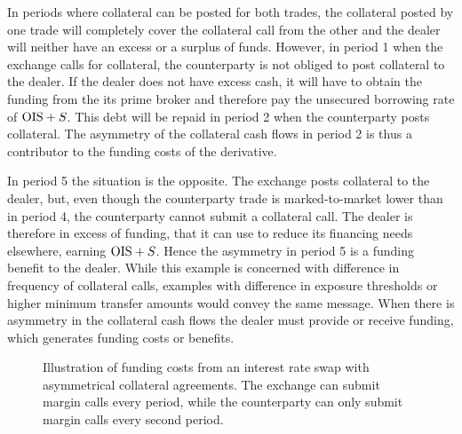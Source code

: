 \documentclass[main.tex]{subfiles}
\begin{document}
        In periods where collateral can be posted for both trades, 
        the collateral posted by one trade will completely cover the collateral call from the other
        and the dealer will neither have an excess or a surplus of funds.
        However, in period 1 when the exchange calls for collateral,
        the counterparty is not obliged to post collateral to the dealer. 
        If the dealer does not have excess cash, 
        it will have to obtain the funding from the its prime broker 
        and therefore pay the unsecured borrowing rate of $\OIS/ + S$. 
        This debt will be repaid in period 2 when the counterparty posts collateral.
        The asymmetry of the collateral cash flows in period 2
        is thus a contributor to the funding costs of the derivative.

        In period 5 the situation is the opposite.
        The exchange posts collateral to the dealer, 
        but, even though the counterparty trade is marked-to-market lower than in period 4,
        the counterparty cannot submit a collateral call. 
        The dealer is therefore in excess of funding,
        that it can use to reduce its financing needs elsewhere, earning $\OIS/ + S$.
        Hence the asymmetry in period 5 is a funding benefit to the dealer.
        While this example is concerned with difference in frequency of collateral calls,
        examples with difference in exposure thresholds or higher minimum transfer amounts 
        would convey the same message.
        When there is asymmetry in the collateral cash flows the dealer must provide or receive funding,
        which generates funding costs or benefits.

        \begin{figure}
            \centering
            \resizebox{\textwidth}{!}{%
            \begin{tikzpicture}
                
            \end{tikzpicture}        
            }   
            \caption{
                Illustration of funding costs from an interest rate swap with asymmetrical collateral agreements.
                The exchange can submit margin calls every period,
                while the counterparty can only submit margin calls every second period.
            }
            \label{fig:funding-costs-asymmetrical-csa}
        \end{figure}
\end{document}
